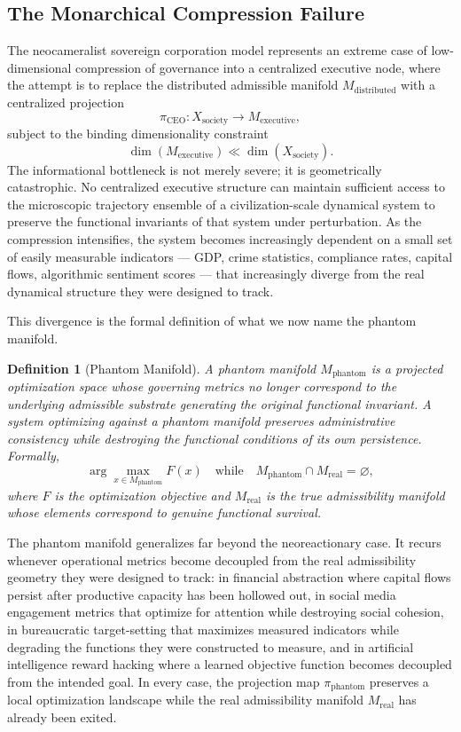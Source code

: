 \documentclass[12pt, a4paper]{article}
\theoremstyle{essaystyle}
\newtheorem{definition}{Definition}
\begin{document}
\subsection{The Monarchical Compression Failure}

The neocameralist sovereign corporation model represents an extreme case of low-dimensional
compression of governance into a centralized executive node, where the attempt is to
replace the distributed admissible manifold $M_{\mathrm{distributed}}$ with a
centralized projection
\[
\pi_{\mathrm{CEO}} : X_{\mathrm{society}} \longrightarrow M_{\mathrm{executive}},
\]
subject to the binding dimensionality constraint
\[
\dim(M_{\mathrm{executive}}) \ll \dim(X_{\mathrm{society}}).
\]
The informational bottleneck is not merely severe; it is geometrically catastrophic.
No centralized executive structure can maintain sufficient access to the microscopic
trajectory ensemble of a civilization-scale dynamical system to preserve the
functional invariants of that system under perturbation. As the compression intensifies,
the system becomes increasingly dependent on a small set of easily measurable
indicators --- GDP, crime statistics, compliance rates, capital flows, algorithmic
sentiment scores --- that increasingly diverge from the real dynamical structure
they were designed to track.

This divergence is the formal definition of what we now name the phantom manifold.

\begin{definition}[Phantom Manifold]
A \emph{phantom manifold} $M_{\mathrm{phantom}}$ is a projected optimization space
whose governing metrics no longer correspond to the underlying admissible substrate
generating the original functional invariant. A system optimizing against a phantom
manifold preserves administrative consistency while destroying the functional
conditions of its own persistence. Formally,
\[
\arg\max_{x \in M_{\mathrm{phantom}}} F(x) \quad \text{while} \quad
M_{\mathrm{phantom}} \cap M_{\mathrm{real}} = \varnothing,
\]
where $F$ is the optimization objective and $M_{\mathrm{real}}$ is the true
admissibility manifold whose elements correspond to genuine functional survival.
\end{definition}

The phantom manifold generalizes far beyond the neoreactionary case. It recurs
whenever operational metrics become decoupled from the real admissibility geometry
they were designed to track: in financial abstraction where capital flows persist
after productive capacity has been hollowed out, in social media engagement
metrics that optimize for attention while destroying social cohesion, in bureaucratic
target-setting that maximizes measured indicators while degrading the functions
they were constructed to measure, and in artificial intelligence reward hacking
where a learned objective function becomes decoupled from the intended goal.
In every case, the projection map $\pi_{\mathrm{phantom}}$ preserves a local
optimization landscape while the real admissibility manifold $M_{\mathrm{real}}$
has already been exited.
\end{document}
